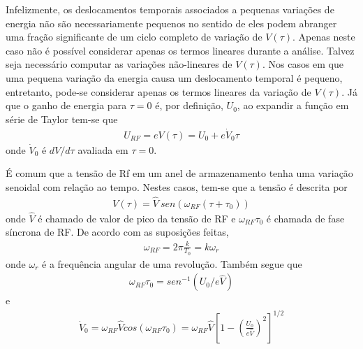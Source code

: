 Infelizmente, os deslocamentos temporais associados a pequenas variações de energia não são necessariamente pequenos no sentido de eles podem abranger uma fração significante de um ciclo completo de variação de $V(\tau)$. Apenas neste caso não é possível considerar apenas os termos lineares durante a análise. Talvez seja necessário computar as variações não-lineares de $V(\tau)$. Nos casos em que uma pequena variação da energia causa um deslocamento temporal é pequeno, entretanto, pode-se considerar apenas os termos lineares da variação de $V(\tau)$. Já que o ganho de energia para $\tau=0$ é, por definição, $U_0$, ao expandir a função em série de Taylor tem-se que
\begin{align}
	U_{RF} = eV(\tau) = U_0 + e\dot{V}_0\tau\label{eq:3.35}
\end{align}
onde $\dot{V}_0$ é $dV/d\tau$ avaliada em $\tau=0$.

É comum que a tensão de Rf em um anel de armazenamento tenha uma variação senoidal com relação ao tempo. Nestes casos, tem-se que a tensão é descrita por
\begin{align}
	V(\tau) = \widehat{V}\ sen(\omega_{RF}(\tau+\tau_0))
\end{align}
onde $\widehat{V}$ é chamado de valor de pico da tensão de RF e $\omega_{RF}\tau_0$ é chamada de fase síncrona de RF. De acordo com as suposições feitas,
\begin{align}
	\omega_{RF} = 2\pi \frac{k}{T_0} = k\omega_r
\end{align}
onde $\omega_r$ é a frequência angular de uma revolução. Também segue que
\begin{align}
	\omega_{RF}\tau_0 = sen^{-1}(U_0/e\widehat{V})
\end{align}
e
\begin{align}
	\dot{V}_0 = \omega_{RF}\widehat{V}cos(\omega_{RF}\tau_0) = \omega_{RF}\widehat{V}\left[1-\left(\frac{U_0}{e\widehat{V}}\right)^2\right]^{1/2}
\end{align}

